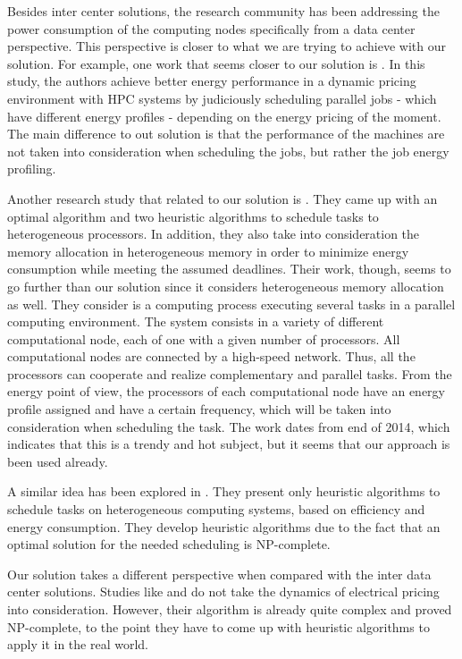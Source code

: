 Besides inter center solutions, the research community has been addressing the power 
consumption of the computing nodes specifically from a data center perspective.
This perspective is closer to what we are trying to achieve with our solution.
For example, one work that seems closer to our solution is \cite{DYN_PRICING_HPC}.
In this study, the authors achieve better energy performance in a dynamic
pricing environment with HPC systems by judiciously scheduling parallel jobs -
which have different energy profiles - depending on the energy pricing of the
moment. The main difference to out solution is that the performance of the machines 
are not taken into consideration when scheduling the jobs, but rather the job energy 
profiling.

Another research study that related to our solution is \cite{TASK_SCHED}. They
came up with an optimal algorithm and two heuristic algorithms to schedule tasks
to heterogeneous processors. In addition, they also take into consideration the 
memory allocation in heterogeneous memory in order
to minimize energy consumption while meeting the assumed deadlines. Their work,
though, seems to go further than our solution since it considers heterogeneous
memory allocation as well. They consider is a
computing process executing several tasks in a parallel computing environment. The
system consists in a variety of different computational node, each of one with a
given number of processors. All computational nodes are connected by a
high-speed network. Thus, all  the processors can cooperate and realize complementary
and parallel tasks. From the energy point of view, the processors of each 
computational node have an energy profile assigned and have a certain frequency, 
which will be taken into consideration when scheduling the task. The work dates 
from end of 2014, which indicates that this is a trendy and hot subject, but it 
seems that our approach is been used already. 

A similar idea has been explored in \cite{EXE_METHOD}. They present only
heuristic algorithms to schedule tasks on heterogeneous computing systems,
based on efficiency and energy consumption. They develop heuristic algorithms
due to the fact that an optimal solution for the needed scheduling is
NP-complete.  

Our solution takes a different perspective when compared with the inter data center 
solutions. Studies like  \cite{TASK_SCHED} and \cite{EXE_METHOD} do not take the
dynamics of electrical pricing into consideration. However, their algorithm is
already quite complex and proved NP-complete, to the point they have to come up
with heuristic algorithms to apply it in the real world.

